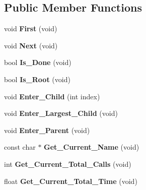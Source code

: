 \subsection*{Public Member Functions}
\begin{DoxyCompactItemize}
\item 
\mbox{\label{classCProfileIterator_aab596c4c39b463b9a2dbd10279bb594e}} 
void {\bfseries First} (void)
\item 
\mbox{\label{classCProfileIterator_a7f003e1cf58d0225cb77514178515454}} 
void {\bfseries Next} (void)
\item 
\mbox{\label{classCProfileIterator_a77994576590dc1382148e637319b3003}} 
bool {\bfseries Is\+\_\+\+Done} (void)
\item 
\mbox{\label{classCProfileIterator_aa339a7aa093e49945ce8f9382d44d22e}} 
bool {\bfseries Is\+\_\+\+Root} (void)
\item 
\mbox{\label{classCProfileIterator_a0c5f6566bcb6cc8faf8372bda6c79f16}} 
void {\bfseries Enter\+\_\+\+Child} (int index)
\item 
\mbox{\label{classCProfileIterator_a7d2788c7bf3ac72beb078a728fe6dd65}} 
void {\bfseries Enter\+\_\+\+Largest\+\_\+\+Child} (void)
\item 
\mbox{\label{classCProfileIterator_a81cce48c9b11334a5a23a7faa4f2c781}} 
void {\bfseries Enter\+\_\+\+Parent} (void)
\item 
\mbox{\label{classCProfileIterator_ad3fffc9d6e49b22c8996090487a2d35d}} 
const char $\ast$ {\bfseries Get\+\_\+\+Current\+\_\+\+Name} (void)
\item 
\mbox{\label{classCProfileIterator_a714cd183984d51bd5cbe1191fc810121}} 
int {\bfseries Get\+\_\+\+Current\+\_\+\+Total\+\_\+\+Calls} (void)
\item 
\mbox{\label{classCProfileIterator_ade475951031ec7c42ce6408271f99236}} 
float {\bfseries Get\+\_\+\+Current\+\_\+\+Total\+\_\+\+Time} (void)

\end{DoxyCompactItemize}
